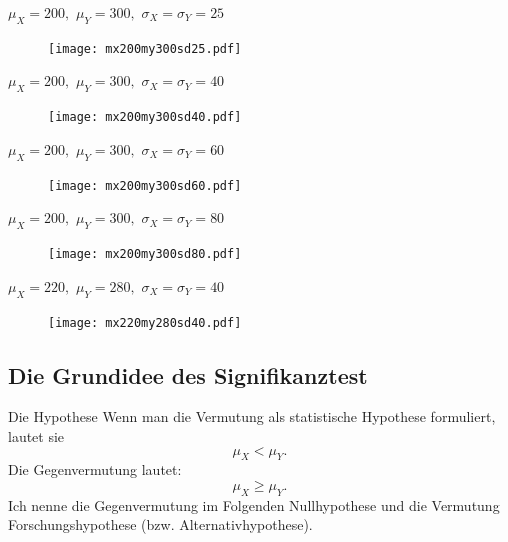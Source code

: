 \documentclass[usenames,dvipsnames,handout]{beamer}
\begin{document}
\begin{frame}{$\mu_{X}=200,$ $\mu_{Y}=300,$ $\sigma_{X}=\sigma_{Y}=25$}
  \begin{figure}[ht]
 	\centering
 	      \texttt{[image: mx200my300sd25.pdf]}%
 	\end{figure}
\end{frame}
%
\begin{frame}{$\mu_{X}=200,$ $\mu_{Y}=300,$ $\sigma_{X}=\sigma_{Y}=40$}
  \begin{figure}[ht]
 	\centering
 	      \texttt{[image: mx200my300sd40.pdf]}
 	\end{figure}
\end{frame}
%
\begin{frame}{$\mu_{X}=200,$ $\mu_{Y}=300,$ $\sigma_{X}=\sigma_{Y}=60$}
  \begin{figure}[ht]
 	\centering
 	      \texttt{[image: mx200my300sd60.pdf]}
 	\end{figure}
\end{frame}
%
\begin{frame}{$\mu_{X}=200,$ $\mu_{Y}=300,$ $\sigma_{X}=\sigma_{Y}=80$}
  \begin{figure}[ht]
 	\centering
 	      \texttt{[image: mx200my300sd80.pdf]}
 	\end{figure}
\end{frame}
%
\begin{frame}{$\mu_{X}=220,$ $\mu_{Y}=280,$ $\sigma_{X}=\sigma_{Y}=40$}
  \begin{figure}[ht]
 	\centering
 	      \texttt{[image: mx220my280sd40.pdf]}
 	\end{figure}
\end{frame}
\subsection{Die Grundidee des Signifikanztest}
\begin{frame}{Die Hypothese}
Wenn man die Vermutung als statistische Hypothese formuliert, lautet sie
$$
\mu_{X} < \mu_{Y}.
$$
Die Gegenvermutung lautet:
$$
\mu_{X} \geq \mu_{Y}.
$$
Ich nenne die Gegenvermutung im Folgenden Nullhypothese und die Vermutung Forschungshypothese (bzw. Alternativhypothese).

\end{frame}
\end{document}
